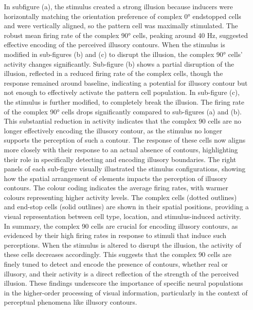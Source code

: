 \documentclass[12pt]{article}
\begin{document}
In subfigure (a), the stimulus created a strong illusion because inducers were horizontally matching the orientation preference of complex 0° endstopped cells and were vertically aligned, so the pattern cell was maximally stimulated. The robust mean firing rate of the complex 90° cells, peaking around 40 Hz, suggested effective encoding of the perceived illusory contours. When the stimulus is modified in sub-figures (b) and (c) to disrupt the illusion, the complex 90° cells' activity changes significantly. Sub-figure (b) shows a partial disruption of the illusion, reflected in a reduced firing rate of the complex cells, though the response remained around baseline, indicating a potential for illusory contour but not enough to effectively activate the pattern cell population.
\bigbreak
In sub-figure (c), the stimulus is further modified, to completely break the illusion. The firing rate of the complex 90° cells drops significantly compared to sub-figures (a) and (b). This substantial reduction in activity indicates that the complex 90 cells are no longer effectively encoding the illusory contour, as the stimulus no longer supports the perception of such a contour. The response of these cells now aligns more closely with their response to an actual absence of contours, highlighting their role in specifically detecting and encoding illusory boundaries. The right panels of each sub-figure visually illustrated the stimulus configurations, showing how the spatial arrangement of elements impacts the perception of illusory contours. The colour coding indicates the average firing rates, with warmer colours representing higher activity levels. The complex cells (dotted outlines) and end-stop cells (solid outlines) are shown in their spatial positions, providing a visual representation between cell type, location, and stimulus-induced activity.
\bigbreak
In summary, the complex 90 cells are crucial for encoding illusory contours, as evidenced by their high firing rates in response to stimuli that induce such perceptions. When the stimulus is altered to disrupt the illusion, the activity of these cells decreases accordingly. This suggests that the complex 90 cells are finely tuned to detect and encode the presence of contours, whether real or illusory, and their activity is a direct reflection of the strength of the perceived illusion. These findings underscore the importance of specific neural populations in the higher-order processing of visual information, particularly in the context of perceptual phenomena like illusory contours.
\end{document}
